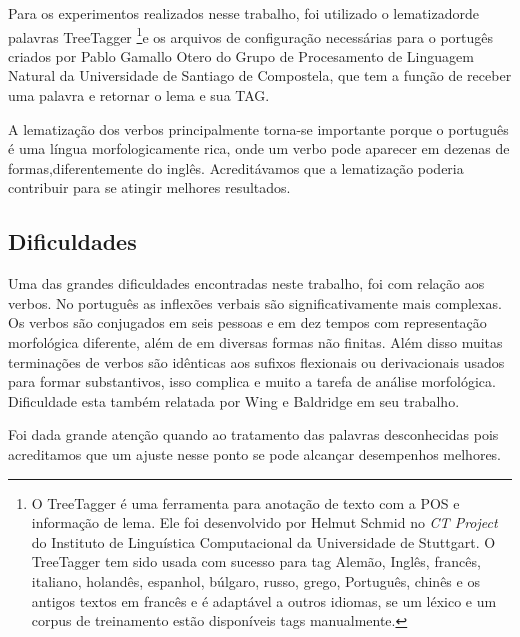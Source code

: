 Para os experimentos realizados nesse trabalho, foi utilizado o lematizadorde palavras TreeTagger \footnote{O TreeTagger é uma ferramenta para anotação de texto com a POS e informação de lema. Ele foi desenvolvido por Helmut Schmid no \emph{CT Project} do Instituto de Linguística Computacional da Universidade de Stuttgart. O TreeTagger tem sido usada com sucesso para tag Alemão, Inglês, francês, italiano, holandês, espanhol, búlgaro, russo, grego, Português, chinês e os antigos textos em francês e é adaptável a outros idiomas, se um léxico e um corpus de treinamento estão disponíveis tags manualmente.}e os arquivos de configuração necessárias para o portugês criados por Pablo Gamallo Otero do Grupo de Procesamento de Linguagem Natural da Universidade de Santiago de Compostela, que tem a função de receber uma palavra e retornar o lema e sua TAG.

A lematização dos verbos principalmente torna-se importante porque o português é uma língua morfologicamente rica, onde um verbo pode aparecer em dezenas de formas,diferentemente do inglês. Acreditávamos que a lematização poderia contribuir para se atingir melhores resultados.


\subsection{Dificuldades}
\label{sec:dificuldades}

Uma das grandes dificuldades encontradas neste trabalho, foi com relação aos verbos. No português as inflexões verbais são significativamente mais complexas. Os verbos são conjugados em seis pessoas e em dez tempos com representação morfológica diferente, além de em diversas formas não finitas. Além disso muitas terminações de verbos são idênticas aos sufixos flexionais ou derivacionais usados para formar substantivos, isso complica e muito a tarefa de análise morfológica. Dificuldade esta também relatada por Wing e Baldridge em seu trabalho.

Foi dada grande atenção quando ao tratamento das palavras desconhecidas pois acreditamos que um ajuste nesse ponto se pode alcançar desempenhos melhores.



